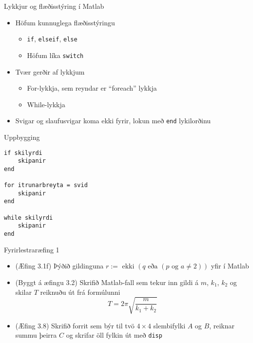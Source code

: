 \documentclass{beamer}
\begin{document}
\begin{frame}{Lykkjur og flæðisstýring í Matlab}
    \begin{itemize}
        \item Höfum kunnuglega flæðisstýringu
        \begin{itemize}
            \item \texttt{if}, \texttt{elseif}, \texttt{else}
            \item Höfum líka \texttt{switch}
        \end{itemize}
        \item Tvær gerðir af lykkjum
        \begin{itemize}
            \item For-lykkja, sem reyndar er ``foreach'' lykkja
            \item While-lykkja
        \end{itemize}
        \item Svigar og slaufusvigar koma ekki fyrir, lokun með \texttt{end} lykilorðinu
    \end{itemize}
\end{frame}

\begin{frame}[fragile]{Uppbygging}
\begin{verbatim}
if skilyrdi
    skipanir
end

for itrunarbreyta = svid
    skipanir
end

while skilyrdi
    skipanir
end
\end{verbatim}
\end{frame}

\begin{frame}{Fyrirlestraræfing 1}
    \begin{itemize}
        \item (Æfing 3.1f) Þýðið gildinguna $r := \text{ ekki } (q \text{ eða } (p \text{ og } a \neq 2))$ yfir í Matlab
        \item (Byggt á æfingu 3.2) Skrifið Matlab-fall sem tekur inn gildi á $m$, $k_1$, $k_2$ og skilar $T$ reiknuðu út frá formúlunni
        \[
            T = 2\pi\sqrt{\frac{m}{k_1+k_2}}
        \]
        \item (Æfing 3.8) Skrifið forrit sem býr til tvö $4 \times 4$ slembifylki $A$ og $B$, reiknar summu þeirra $C$ og skrifar öll fylkin út með \texttt{disp}
    \end{itemize}
\end{frame}
\end{document}
